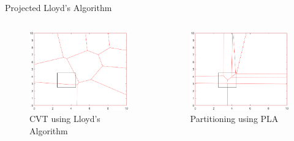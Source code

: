\documentclass[t]{beamer}
\begin{document}
\begin{frame}[label=projlloydsalgo3]{Projected Lloyd's Algorithm}
\begin{columns}
\begin{figure}[!H]
  \includegraphics[scale=0.43]{Problem-solution/proj-lloyds-off.eps}
  \caption*{CVT using Lloyd's Algorithm}
\end{figure}
\begin{figure}[!H]
  \includegraphics[scale=0.43]{Problem-solution/proj-lloyds-on.eps}
  \caption*{Partitioning using PLA}
\end{figure}
\end{columns}

\end{frame}
\end{document}
